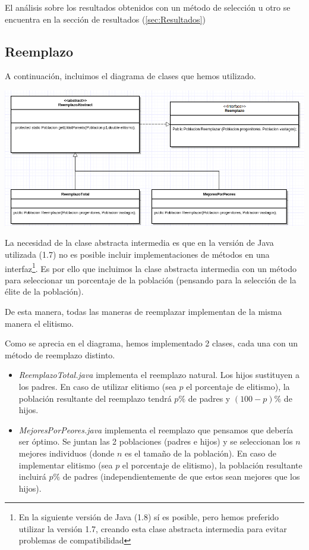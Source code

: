 \documentclass[nochap]{apuntes}
\begin{document}
 El análisis sobre los resultados obtenidos con un método de selección u otro se encuentra en la sección de resultados (\ref{sec:Resultados}) 


\subsection{Reemplazo}
A continuación, incluimos el diagrama de clases que hemos utilizado.


\begin{center}
\includegraphics[scale=0.4]{img/ReemplazoUML.png}
\end{center}

La necesidad de la clase abstracta intermedia es que en la versión de Java utilizada (1.7) no es posible incluir implementaciones de métodos en una interfaz\footnote{En la siguiente versión de Java (1.8) sí es posible, pero hemos preferido utilizar la versión 1.7, creando esta clase abstracta intermedia para evitar problemas de compatibilidad}. Es por ello que incluimos la clase abstracta intermedia  con un método para seleccionar un porcentaje de la población (pensando para la selección de la élite de la población).

De esta manera, todas las maneras de reemplazar implementan de la misma manera el elitismo.

Como se aprecia en el diagrama, hemos implementado 2 clases, cada una con un método de reemplazo distinto.

\begin{itemize}
	\item \textit{ReemplazoTotal.java} implementa el reemplazo natural. Los hijos sustituyen a los padres. En caso de utilizar elitismo (sea $p$ el porcentaje de elitismo), la población resultante del reemplazo tendrá $p\%$ de padres y $(100-p)\%$ de hijos.
	\item \textit{MejoresPorPeores.java} implementa el reemplazo que pensamos que debería ser óptimo. Se juntan las 2 poblaciones (padres e hijos) y se seleccionan los $n$ mejores individuos (donde $n$ es el tamaño de la población). 
	\subitem En caso de implementar elitismo (sea $p$ el porcentaje de elitismo), la población resultante incluirá $p\%$ de padres (independientemente de que estos sean mejores que los hijos).
\end{itemize}
\end{document}
